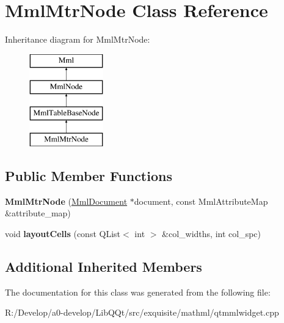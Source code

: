 \hypertarget{class_mml_mtr_node}{}\section{Mml\+Mtr\+Node Class Reference}
\label{class_mml_mtr_node}
Inheritance diagram for Mml\+Mtr\+Node\+:\begin{figure}[H]
\begin{center}
\leavevmode
\includegraphics[height=4.000000cm]{class_mml_mtr_node}
\end{center}
\end{figure}
\subsection*{Public Member Functions}
\begin{DoxyCompactItemize}
\item 
\mbox{\label{class_mml_mtr_node_a58d33935342a53303f5d65be2978095a}} 
{\bfseries Mml\+Mtr\+Node} (\mbox{\hyperlink{class_mml_document}{Mml\+Document}} $\ast$document, const Mml\+Attribute\+Map \&attribute\+\_\+map)
\item 
\mbox{\label{class_mml_mtr_node_a173de2cdba4b49e36f16089eabc92f88}} 
void {\bfseries layout\+Cells} (const Q\+List$<$ int $>$ \&col\+\_\+widths, int col\+\_\+spc)
\end{DoxyCompactItemize}
\subsection*{Additional Inherited Members}


The documentation for this class was generated from the following file\+:\begin{DoxyCompactItemize}
\item 
R\+:/\+Develop/a0-\/develop/\+Lib\+Q\+Qt/src/exquisite/mathml/qtmmlwidget.\+cpp\end{DoxyCompactItemize}
